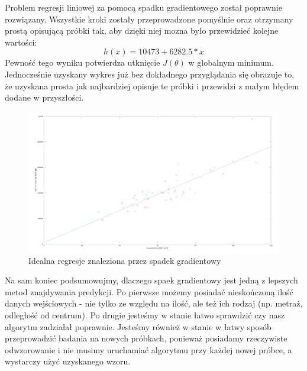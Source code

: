 Problem regresji liniowej za pomocą spadku gradientowego został poprawnie rozwiązany. Wszystkie kroki zostały przeprowadzone pomyślnie oraz otrzymany prostą opisującą próbki tak, aby dzięki niej mozna było przewidzieć kolejne wartości:
\newline
\large
$$
h(x) = 10473 + 6282.5 * x
$$
\normalsize
\noindent
\newline
Pewność tego wyniku potwierdza utknięcie $J(\theta)$ w globalnym minimum. Jednocześnie uzyskany wykres już bez dokładnego przyglądania się obrazuje to, że uzyskana prosta jak najbardziej opisuje te próbki i przewidzi z małym błędem dodane w przyszłości.


	\begin{figure}[H]
    \centering
    \includegraphics[scale=0.22]{PNG/perfect_grad.png}
    \caption{Idealna regresje znaleziona przez spadek gradientowy}
    \label{lamana}
	\end{figure}
	

Na sam koniec podsumowujmy, dlaczego spaek gradientowy jest jedną z lepszych metod znajdywania predykcji. Po pierwsze możemy posiadać nieskończoną ilość danych wejściowych - nie tylko ze względu na ilość, ale też ich rodzaj (np. metraż, odległość od centrum). Po drugie jesteśmy w stanie łatwo sprawdzić czy nasz algorytm zadziałał poprawnie. Jesteśmy również w stanie w łatwy sposób przeprowadzić badania na nowych próbkach, ponieważ posiadamy rzeczywiste odwzorowanie i nie musimy uruchamiać algorytmu przy każdej nowej próbce, a wystarczy użyć uzyskanego wzoru.
